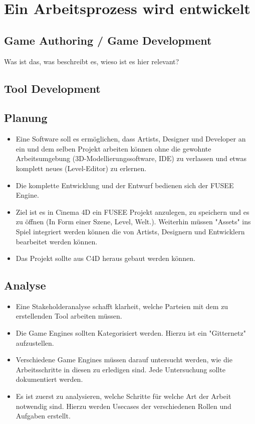 \documentclass[pagesize, paper=a4, fontsize=12pt,titlepage=true, headings=small, headnosepline, abstractoff, liststotoc, nochapterprefix, plainheadsepline, twoside]{scrreprt}
\begin{document}
\section{Ein Arbeitsprozess wird entwickelt}
\subsection{Game Authoring / Game Development}
Was ist das, was beschreibt es, wieso ist es hier relevant?
\subsection{Tool Development}

\subsection{Planung}
\begin{itemize}
\item Eine Software soll es ermöglichen, dass Artists, Designer und Developer an ein und dem selben Projekt arbeiten können ohne die gewohnte Arbeitsumgebung (3D-Modellierungssoftware, IDE) zu verlassen und etwas komplett neues (Level-Editor) zu erlernen.
\item Die komplette Entwicklung und der Entwurf bedienen sich der FUSEE Engine.
\item Ziel ist es in Cinema 4D ein FUSEE Projekt anzulegen, zu speichern und es zu öffnen (In Form einer Szene, Level, Welt.). Weiterhin müssen "Assets" ins Spiel integriert werden können die von Artists, Designern und Entwicklern bearbeitet werden können.
\item Das Projekt sollte aus C4D heraus gebaut werden können.
\end{itemize}

\subsection{Analyse}
\begin{itemize}
\item Eine Stakeholderanalyse schafft klarheit, welche Parteien mit dem zu erstellenden Tool arbeiten müssen.
\item Die Game Engines sollten Kategorisiert werden. Hierzu ist ein "Gitternetz" aufzustellen.
\item Verschiedene Game Engines müssen darauf untersucht werden, wie die Arbeitsschritte in diesen zu erledigen sind. Jede Untersuchung sollte dokumentiert werden.
\item Es ist zuerst zu analysieren, welche Schritte für welche Art der Arbeit notwendig sind. Hierzu werden Usecases der verschiedenen Rollen und Aufgaben erstellt.
\end{itemize}
\end{document}
